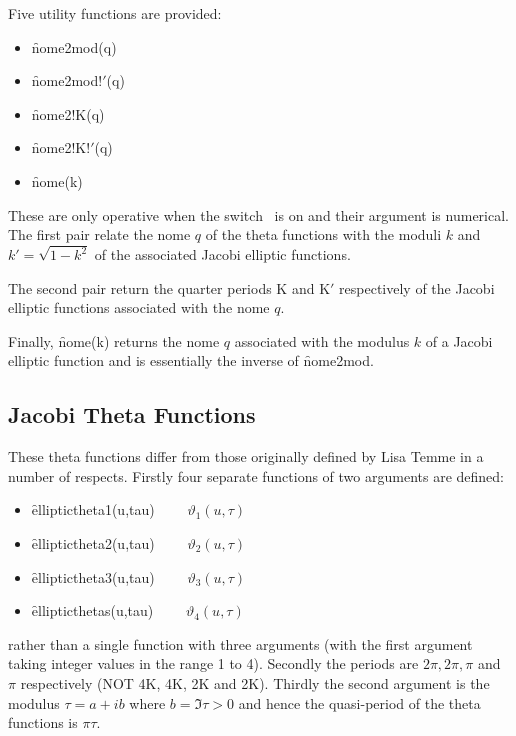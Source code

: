 Five utility functions are provided:
\begin{itemize}
\item \f{nome2mod(q)}
\item \f{nome2mod!$'$(q)}
\item \f{nome2!K(q)}
\item \f{nome2!K!$'$(q)}
\item \f{nome(k)}
\end{itemize}

These are only operative when the switch \ is on and their
argument is numerical. The first pair relate the nome $q$ of the theta
functions with the moduli $k$ and $k'=\sqrt{1-k^2}$ of the associated Jacobi
elliptic functions.

The second pair return the quarter periods K and K$'$ respectively of
the Jacobi elliptic functions associated with the nome $q$.

Finally, \f{nome(k)} returns the nome $q$ associated with the modulus $k$ of
a Jacobi elliptic function and is essentially the inverse of \f{nome2mod}.

\subsection{Jacobi Theta Functions}
\hypertarget{JACTF}{}
These theta functions differ from those originally defined by Lisa Temme
in a number of respects.
Firstly four separate functions of two arguments are defined:
\hypertarget{operator:ELLIPTICTHETA1}{}
\hypertarget{operator:ELLIPTICTHETA2}{}
\hypertarget{operator:ELLIPTICTHETA3}{}
\hypertarget{operator:ELLIPTICTHETA4}{}
 
 
\begin{itemize}
\item \f{elliptictheta1(u,tau)} $\qquad \vartheta_1(u, \tau)$
\item \f{elliptictheta2(u,tau)} $\qquad \vartheta_2(u, \tau)$
\item \f{elliptictheta3(u,tau)} $\qquad \vartheta_3(u, \tau)$
\item \f{ellipticthetas(u,tau)} $\qquad \vartheta_4(u, \tau)$
\end{itemize}

rather than a single function with three arguments (with the first argument
taking integer values in the range 1 to 4).
Secondly the periods are $2\pi, 2\pi, \pi$ and $\pi$ respectively
(NOT 4K, 4K, 2K and 2K).
Thirdly the second argument is the modulus $\tau = a+i b$ where $b=\Im\tau>0$
and hence the quasi-period of the theta functions is $\pi\tau$.

